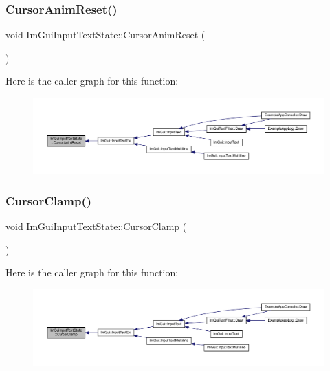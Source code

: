 \subsubsection{\texorpdfstring{Cursor\+Anim\+Reset()}{CursorAnimReset()}}
{\footnotesize\ttfamily void Im\+Gui\+Input\+Text\+State\+::\+Cursor\+Anim\+Reset (\begin{DoxyParamCaption}{ }\end{DoxyParamCaption})\hspace{0.3cm}{\ttfamily [inline]}}

Here is the caller graph for this function\+:
\nopagebreak
\begin{figure}[H]
\begin{center}
\leavevmode
\includegraphics[width=350pt]{struct_im_gui_input_text_state_a78a05f36dbfd38b9026a4980a15a6a3e_icgraph}
\end{center}
\end{figure}
\mbox{\label{struct_im_gui_input_text_state_a0924f1eead76c7d58090aa603cea4301}} 
\subsubsection{\texorpdfstring{Cursor\+Clamp()}{CursorClamp()}}
{\footnotesize\ttfamily void Im\+Gui\+Input\+Text\+State\+::\+Cursor\+Clamp (\begin{DoxyParamCaption}{ }\end{DoxyParamCaption})\hspace{0.3cm}{\ttfamily [inline]}}

Here is the caller graph for this function\+:
\nopagebreak
\begin{figure}[H]
\begin{center}
\leavevmode
\includegraphics[width=350pt]{struct_im_gui_input_text_state_a0924f1eead76c7d58090aa603cea4301_icgraph}
\end{center}
\end{figure}
\mbox{\label{struct_im_gui_input_text_state_ab17832413ff121a5663319c06bbb989a}} 
